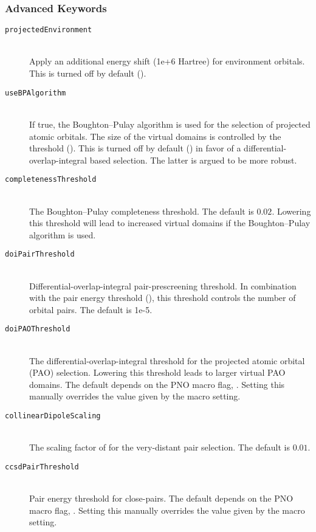 \subsubsection{Advanced Keywords}
\begin{description}
    \item [\texttt{projectedEnvironment}]\hfill \\
    Apply an additional energy shift (1e+6 Hartree) for environment orbitals.
    This is turned off by default ().
    \item [\texttt{useBPAlgorithm}]\hfill \\
    If true, the Boughton--Pulay algorithm is used for the selection of projected atomic orbitals. The size of the
    virtual domains is controlled by the threshold (). This is turned off by default
    () in favor of a differential-overlap-integral based selection. The latter is argued to be more robust.
    \item [\texttt{completenessThreshold}]\hfill \\
    The Boughton--Pulay completeness threshold. The default is $0.02$. Lowering this threshold will lead to
    increased virtual domains if the Boughton--Pulay algorithm is used.
    \item [\texttt{doiPairThreshold}]\hfill \\
    Differential-overlap-integral pair-prescreening threshold. In combination with the pair energy threshold
    (), this threshold controls the number of orbital pairs.
    The default is 1e-5.
    \item [\texttt{doiPAOThreshold}]\hfill \\
    The differential-overlap-integral threshold for the projected atomic orbital (PAO) selection. Lowering this
    threshold leads to larger virtual PAO domains. The default depends on the PNO macro flag,
    . Setting this manually overrides the value given by the macro setting.
    \item [\texttt{collinearDipoleScaling}]\hfill \\
    The scaling factor of  for the very-distant pair selection.
    The default is $0.01$.
    \item [\texttt{ccsdPairThreshold}]\hfill \\
    Pair energy threshold for close-pairs. The default depends on the PNO macro flag, .
    Setting this manually overrides the value given by the macro setting.

\end{description}
